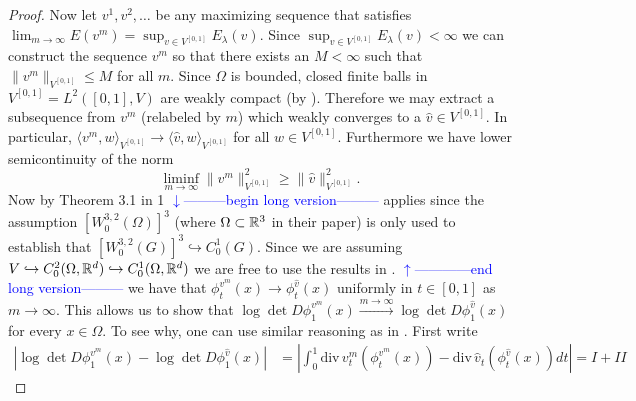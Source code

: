 \documentclass[noinfoline]{imsart}
\def\Ver{1}
\def\LongVer{1}
\begin{document}
\begin{proof}
Now let $v^1,v^2,\ldots$ be any maximizing sequence that satisfies $\lim_{m\rightarrow \infty} E(v^m) = \sup_{v\in V^{[0,1]}}E_\lambda(v)$. Since $\sup_{v\in V^{[0,1]}}E_\lambda(v)<\infty $  we can construct the sequence $v^m$ so that there exists an $M<\infty$ such that $\| v^m \|_{V^{[0,1]}}\leq M$ for all $m$. Since $\Omega$ is bounded, closed finite balls in $V^{[0,1]}=L^2([0,1],V)$ are weakly compact (by \cite{dup:98}). Therefore we may  extract a subsequence from $v^m$ (relabeled by $m$) which weakly converges to  a $\hat v \in V^{[0,1]}$. In particular, $\langle v^m, w \rangle_{V^{[0,1]}}\rightarrow \langle \hat v, w \rangle_{V^{[0,1]}}$ for all $w\in V^{[0,1]}$. Furthermore we have lower semicontinuity of the norm
\begin{equation}
\label{liminf}
 \liminf_{m\rightarrow \infty} \| v^m \|^2_{V^{[0,1]}} \geq  \| \hat v \|^2_{V^{[0,1]}}.
\end{equation}
Now by Theorem 3.1 in \cite{dup:98} 
\if\Ver\LongVer{ 
{\flushleft\textcolor{blue}{$\downarrow$---------begin long version---------}}\newline
\cite{dup:98}  applies since the assumption $[W_0^{3,2}(\Omega)]^3$ (where $\Omega\subset \Bbb R^3$ in their paper) is only used to establish that $[W_0^{3,2}(G)]^3\hookrightarrow C_0^1(G)$. Since we are assuming $V\hookrightarrow C_0^2(\Omega, \Bbb R^d)\hookrightarrow C_0^1(\Omega, \Bbb R^d)$ we are free to use the results in \cite{dup:98} . 
{\flushleft\textcolor{blue}{$\uparrow$------------end long version---------}}\newline
} \fi
 we have that  $\phi^{v^m}_t(x) \rightarrow \phi^{\hat v}_t(x)$ uniformly in $t\in [0,1]$ as $m\rightarrow \infty$. 
This allows us to show that $\log \det D\phi_1^{v^m}(x)\overset{m\rightarrow\infty}\longrightarrow \log \det D\phi_1^{\hat v}(x)$ for every $x\in \Omega$. To see why, one can use similar reasoning as in \cite{cao:05}. First write
\begin{align*}
|\log \det D\phi_1^{v^m}(x)- \log \det D\phi_1^{\hat v}(x)| &= \left| \int_{0}^1 \text{div}\, v_t^m(\phi_t^{v^m}(x)) -  \text{div}\, \hat v_t(\phi_t^{\hat v}(x)) dt \right| 
=I + I\!I 

\end{align*}
\end{proof}
\end{document}
